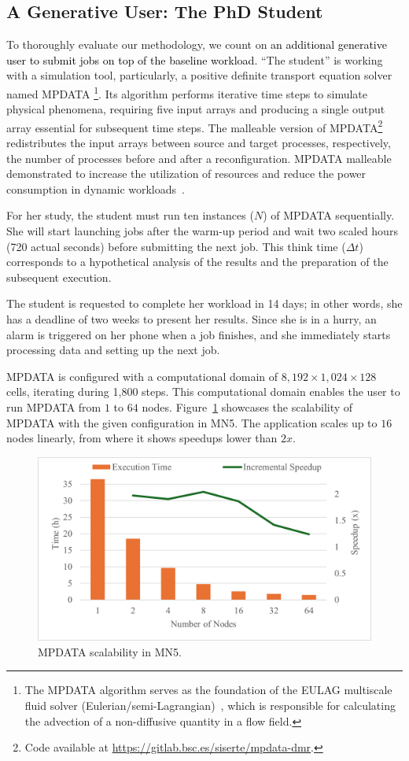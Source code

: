 \documentclass[a4paper,fleqn]{cas-dc}
\newcommand{\sergio}[1]{\textcolor{black}{#1}}
\begin{document}
\subsection{A Generative User: The PhD Student}
\label{subsec:phdstudent}
To thoroughly evaluate our methodology, we count on \sergio{an additional generative user to submit jobs on top of the baseline workload.}
``The student'' is working with a simulation tool, particularly, a positive definite transport equation solver named MPDATA%
\footnote{
The MPDATA algorithm serves as the foundation of the EULAG multiscale fluid solver (Eulerian/semi-Lagrangian)~\cite{rojek_parallelization_2015}, which is responsible for calculating the advection of a non-diffusive quantity in a flow field.
}.
Its algorithm performs iterative time steps to simulate physical phenomena, requiring five input arrays and producing a single output array essential for subsequent time steps. 
The malleable version of MPDATA\footnote{Code available at \url{https://gitlab.bsc.es/siserte/mpdata-dmr}.} redistributes the input arrays between source and target processes, respectively, the number of processes before and after a reconfiguration.
MPDATA malleable demonstrated to increase the utilization of resources and reduce the power consumption in dynamic workloads~\cite{iserte_study_2020}.

For her study, the student must run ten instances ($N$) of MPDATA sequentially.
She will start launching jobs after the warm-up period and wait two scaled hours (720 actual seconds) before submitting the next job. 
This think time ($\Delta t$) corresponds to a hypothetical analysis of the results and the preparation of the subsequent execution.

The student is requested to complete her workload in 14 days; in other words, she has a deadline of two weeks to present her results.
Since she is in a hurry, an alarm is triggered on her phone when a job finishes, and she immediately starts processing data and setting up the next job.

MPDATA is configured with a computational domain of $8,192\times 1,024\times 128$ cells, iterating during 1,800 steps. 
This computational domain enables the user to run MPDATA from $1$ to $64$ nodes.
Figure~\ref{fig:mpdata-speedup} showcases the scalability of MPDATA with the given configuration in MN5.
The application scales up to $16$ nodes linearly, from where it shows speedups lower than $2x$.

\begin{figure}[tbp]
    \centering
\includegraphics[clip,width=0.7\linewidth,trim={0.1cm 0.5cm 0.1cm 0.1cm}]{figures/mpdata.png}
    \caption{MPDATA scalability in MN5.}
    \label{fig:mpdata-speedup}
\end{figure}
\end{document}
